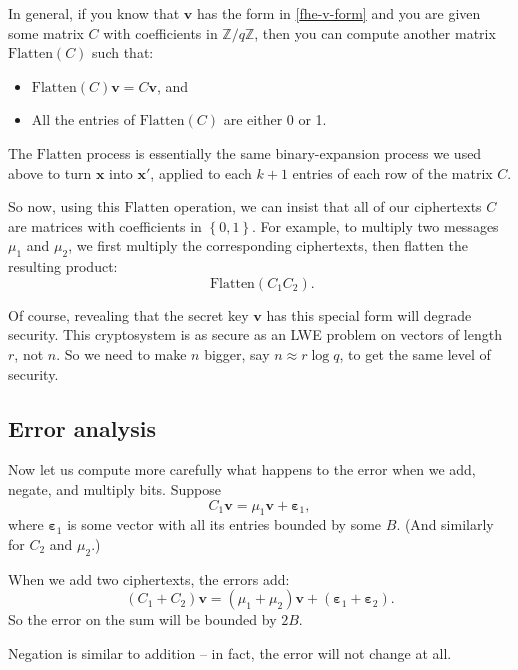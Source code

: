 In general, if you know that \(\mathbf{v}\) has the form in
\hyperref[fhe-v-form]{{[}fhe-v-form{]}} and you are given some matrix
\(C\) with coefficients in \({\mathbb{Z}}/q{\mathbb{Z}}\), then you can
compute another matrix \(\text{Flatten}(C)\) such that:

\begin{itemize}
\item
  \(\text{Flatten}(C)\mathbf{v} = C\mathbf{v}\), and
\item
  All the entries of \(\text{Flatten}(C)\) are either 0 or 1.
\end{itemize}

The \(\text{Flatten}\) process is essentially the same binary-expansion
process we used above to turn \(\mathbf{x}\) into \(\mathbf{x}'\),
applied to each \(k + 1\) entries of each row of the matrix \(C\).

So now, using this \(\text{Flatten}\) operation, we can insist that all
of our ciphertexts \(C\) are matrices with coefficients in
\(\left\{ 0,1 \right\}\). For example, to multiply two messages
\(\mu_{1}\) and \(\mu_{2}\), we first multiply the corresponding
ciphertexts, then flatten the resulting product:
\[\text{ Flatten}\left( C_{1}C_{2} \right).\]

Of course, revealing that the secret key \(\mathbf{v}\) has this special
form will degrade security. This cryptosystem is as secure as an LWE
problem on vectors of length \(r\), not \(n\). So we need to make \(n\)
bigger, say \(n \approx r\log q\), to get the same level of security.

\subsection{Error analysis}\label{error-analysis}

Now let us compute more carefully what happens to the error when we add,
negate, and multiply bits. Suppose
\[C_{1}\mathbf{v} = \mu_{1}\mathbf{v} + \mathbf{\varepsilon}_{1},\]
where \(\mathbf{\varepsilon}_{1}\) is some vector with all its entries
bounded by some \(B\). (And similarly for \(C_{2}\) and \(\mu_{2}\).)

When we add two ciphertexts, the errors add:
\[\left( C_{1} + C_{2} \right)\mathbf{v} = \left( \mu_{1} + \mu_{2} \right)\mathbf{v} + \left( \mathbf{\varepsilon}_{1} + \mathbf{\varepsilon}_{2} \right).\]
So the error on the sum will be bounded by \(2B\).

Negation is similar to addition -- in fact, the error will not change at
all.

